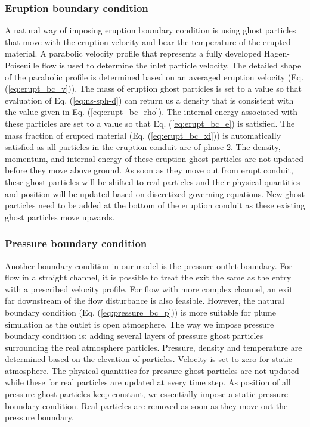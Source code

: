 \documentclass[journal abbreviation, manuscript]{copernicus}
\begin{document}
\subsubsection{Eruption boundary condition}
A natural way of imposing eruption boundary condition is using ghost particles that move with the eruption velocity and bear the temperature of the erupted material. A parabolic velocity profile that represents a fully developed Hagen-Poiseuille flow is used to determine the inlet particle velocity. The detailed shape of the parabolic profile is determined based on an averaged eruption velocity (Eq. (\ref{eq:erupt_bc_v})). The mass of eruption ghost particles is set to a value so that evaluation of Eq. (\ref{eq:ns-sph-d}) can return us a density that is consistent with the value given in Eq. (\ref{eq:erupt_bc_rho}). 
The internal energy associated with these particles are set to a value so that Eq. (\ref{eq:erupt_bc_e}) is satisfied. The mass fraction of erupted material (Eq. (\ref{eq:erupt_bc_xi})) is automatically satisfied as all particles in the eruption conduit are of phase 2. The density, momentum, and internal energy of these eruption ghost particles are not updated before they move above ground. As soon as they move out from erupt conduit, these ghost particles will be shifted to real particles and their physical quantities and position will be updated based on discretized governing equations. New ghost particles need to be added at the bottom of the eruption conduit as these existing ghost particles move upwards.

\subsubsection{Pressure boundary condition}
Another boundary condition in our model is the pressure outlet boundary. For flow in a straight channel, it is possible to treat the exit the same as the entry with a prescribed velocity profile. For flow with more complex channel, an exit far downstream of the flow disturbance is also feasible. However, the natural boundary condition (Eq. (\ref{eq:pressure_bc_p})) is more suitable for plume simulation as the outlet is open atmosphere. The way we impose pressure boundary condition is: adding several layers of pressure ghost particles surrounding the real atmosphere particles. Pressure, density and temperature are determined based on the elevation of particles. Velocity is set to zero for static atmosphere. The physical quantities for pressure ghost particles are not updated while these for real particles are updated at every time step. As position of all pressure ghost particles keep constant, we essentially impose a static pressure boundary condition. Real particles are removed as soon as they move out the pressure boundary.
\end{document}
